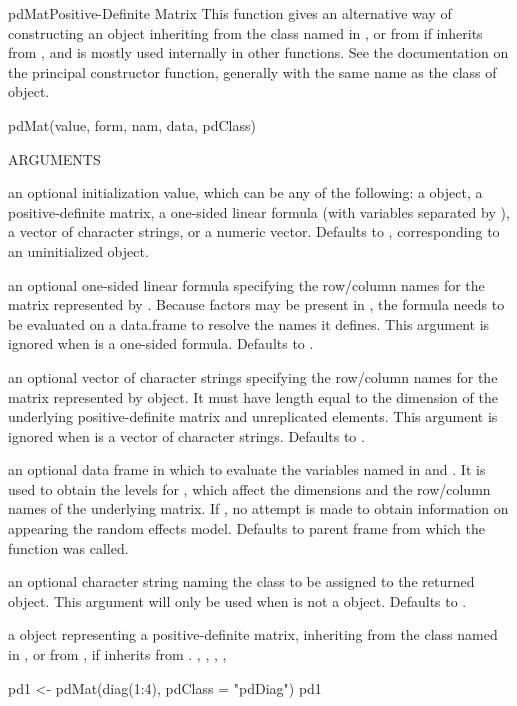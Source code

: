 \documentclass[pdftex]{article} \usepackage{url,graphicx}
\begin{document}
\begin{Helpfile}{pdMat}{Positive-Definite Matrix}
This function gives an alternative way of constructing an object
inheriting from the  class named in , or
from  if  inherits from
,  and is mostly used internally in other functions. See
the documentation on the principal constructor function, generally
with the same name as the  class of object.
\begin{Example}
pdMat(value, form, nam, data, pdClass)
\end{Example}
\begin{Argument}{ARGUMENTS}
\item[\Co{value:}]
an optional initialization value, which can be any of the
following: a  object, a positive-definite
matrix, a one-sided linear formula (with variables separated by
\Co{+}), a vector of character strings, or a numeric
vector. Defaults to , corresponding to an
uninitialized object.
\item[\Co{form:}]
an optional one-sided linear formula specifying the
row/column names for the matrix represented by . Because
factors may be present in , the formula needs to be
evaluated on a data.frame to resolve the names it defines. This
argument is ignored when  is a one-sided
formula. Defaults to .
\item[\Co{nam:}]
an optional vector of character strings specifying the
row/column names for the matrix represented by object. It must have 
length equal to the dimension of the underlying positive-definite
matrix and unreplicated elements. This argument is ignored when
 is a vector of character strings. Defaults to
.
\item[\Co{data:}]
an optional data frame in which to evaluate the variables
named in  and . It is used to
obtain the levels for , which affect the
dimensions and the row/column names of the underlying matrix. If
, no attempt is made to obtain information on 
 appearing the random effects model. Defaults to parent
frame from which the function was called.
\item[\Co{pdClass:}]
an optional character string naming the
 class to be assigned to the returned object. This
argument will only be used when  is not a  
object. Defaults to .
\end{Argument}
a  object representing a positive-definite matrix,
inheriting from the class named in , or from
, if  inherits from .
, ,
, , 
\need 15pt
\vspace{-16pt} 
\begin{Example}
pd1 <- pdMat(diag(1:4), pdClass = "pdDiag")
pd1
\end{Example}
\end{Helpfile}
\end{document}
